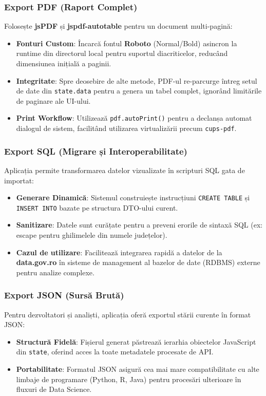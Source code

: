 \documentclass[12pt,a4paper]{article}
\begin{document}
\subsubsection{Export PDF (Raport Complet)}
Folosește \textbf{jsPDF} și \textbf{jspdf-autotable} pentru un document multi-pagină:
\begin{itemize}
    \item \textbf{Fonturi Custom}: Încarcă fontul \textbf{Roboto} (Normal/Bold) asincron la runtime din directorul local pentru suportul diacriticelor, reducând dimensiunea inițială a paginii.
    \item \textbf{Integritate}: Spre deosebire de alte metode, PDF-ul re-parcurge întreg setul de date din \texttt{state.data} pentru a genera un tabel complet, ignorând limitările de paginare ale UI-ului.
    \item \textbf{Print Workflow}: Utilizează \texttt{pdf.autoPrint()} pentru a declanșa automat dialogul de sistem, facilitând utilizarea virtualizării precum \texttt{cups-pdf}.
\end{itemize}

\subsubsection{Export SQL (Migrare și Interoperabilitate)}
Aplicația permite transformarea datelor vizualizate în scripturi SQL gata de importat:
\begin{itemize}
    \item \textbf{Generare Dinamică}: Sistemul construiește instrucțiuni \texttt{CREATE TABLE} și \texttt{INSERT INTO} bazate pe structura DTO-ului curent.
    \item \textbf{Sanitizare}: Datele sunt curățate pentru a preveni erorile de sintaxă SQL (ex: escape pentru ghilimelele din numele județelor).
    \item \textbf{Cazul de utilizare}: Facilitează integrarea rapidă a datelor de la \textbf{data.gov.ro} în sisteme de management al bazelor de date (RDBMS) externe pentru analize complexe.
\end{itemize}

\subsubsection{Export JSON (Sursă Brută)}
Pentru dezvoltatori și analiști, aplicația oferă exportul stării curente în format JSON:
\begin{itemize}
    \item \textbf{Structură Fidelă}: Fișierul generat păstrează ierarhia obiectelor JavaScript din \texttt{state}, oferind acces la toate metadatele procesate de API.
    \item \textbf{Portabilitate}: Formatul JSON asigură cea mai mare compatibilitate cu alte limbaje de programare (Python, R, Java) pentru procesări ulterioare în fluxuri de Data Science.
\end{itemize}
\end{document}
